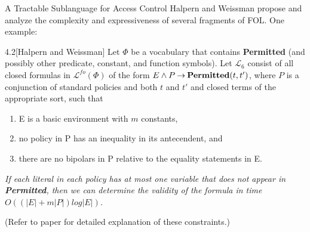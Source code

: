 \documentclass[style=sailor,size=12pt]{powerdot}
\begin{document}
\begin{wideslide}[bm=,toc=]{A Tractable Sublanguage for Access
  Control}
Halpern and Weissman propose and analyze the complexity and expressiveness
of several fragments of FOL. One example:
\pause
\begin{thm}{4.2}[Halpern and Weissman]
Let $\Phi$ be a vocabulary that contains {\bf Permitted} (and possibly
other predicate, constant, and function symbols). Let $\mathcal{L}_6$
consist of all closed formulas in $\mathcal{L}^{fo}(\Phi)$ of the
form $E \land P \mathbin{\rightarrow} \mbox{\bf Permitted}(t,t')$, where $P$ is a conjunction
of standard policies and both $t$ and $t'$ and closed terms of the
appropriate sort, such that
\end{thm}
\vspace{-2ex}
\begin{enumerate}
\renewcommand{\labelenumi}{\alph{enumi})}
\item<3-> E is a basic environment with $m$ constants,
\item<4-> no policy in P has an inequality in its antecendent, and
\item<5-> there are no bipolars in P relative to the equality statements
in E.
\end{enumerate}
\pause[4]
\emph{If each literal in each policy has at most one variable
  that does not appear in {\bf Permitted}, then we can determine
    the validity of the formula in time $O((|E| + m|P|)log|E|)$.}

    {\tiny (Refer to paper for detailed explanation of these constraints.)}
\end{wideslide}
\end{document}
